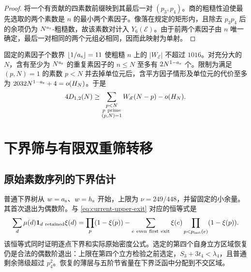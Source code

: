 \begin{proof}
将一个有贡献的四素数前缀映到其最后一对 $(p_3,p_4)$。商的粗糙性迫使最先选取的两个素数是 $n$ 的最小两个素因子。像落在规定的矩形内，且除去 $p_3p_4$ 后的余项仍为 $N^{a_{\rm s}}$-粗糙数，故该素数对计入 $Y_6(\mathscr E)$。由于前两个素因子由 $n$ 唯一确定，最后一对相同的两个元组必相同，因而此映射为单射。
\end{proof}

固定的素因子个数界 $\lfloor1/{a_{\rm s}}\rfloor=11$ 使粗糙 $n$ 上的 $|W_{\mathscr E}|$ 不超过 $1016$。对充分大的 $N$，含有至少为 $N^{a_{\rm s}}$ 的重复素因子的 $n\le N$ 至多有 $2N^{1-{a_{\rm s}}}$ 个。限制为满足 $(p,N)=1$ 的素数 $p<N$ 并去掉单位元后，含平方因子情形及单位元的代价至多为 $2032N^{1-{a_{\rm s}}}+4=o(H_N)$。于是
\begin{equation}
 4D_{1,2}(N)\ge
       \sum_{\substack{p<N\\p\ {\rm prime}\\(p,N)=1}}W_{\mathscr E}(N-p)
        -o(H_N).
 \label{eq:current-weight-to-count}
\end{equation}

\section{下界筛与有限双重筛转移}
\label{sec:current-lower}

\subsection{原始素数序列的下界估计}

普通下界树从 $w={a_{\rm s}}$、$w={h_{\rm s}}$ 开始，上限为 $\nu=249/448$，并留固定的小余量。其首次退出为偶数阶。与 \eqref{eq:current-upper-exit} 对应的恒等式是
\begin{equation}
 \sum_d\mu(d){\mathbf 1}_{d\ {\rm retained}}\xi(d)
 =\prod_p(1-\xi(p))
  -\sum_{e\ {\rm even\ first\ exit}}\xi(e)
                       \prod_{p<p_{\rm last}(e)}(1-\xi(p)).
 \label{eq:current-lower-exit}
\end{equation}
该恒等式同时证明逐点下界和实际原始密度公式。选定的第四个自身立方区域恢复仍是合法的偶数阶退出：上限在第四个立方检验之前选定，$S_3+3t_4<\lambda_4$，且普通剩余筛级超过 $p_4^2$。恢复的薄层与五阶节省量在下界泛函中分配到不交区域。

